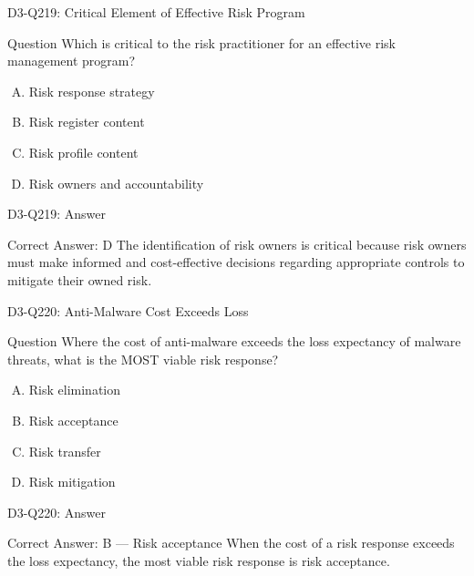 \documentclass{beamer}
\begin{document}
	\begin{frame}{D3-Q219: Critical Element of Effective Risk Program}
		\begin{block}{Question}
			Which is critical to the risk practitioner for an effective risk management program?
		\end{block}
		\begin{enumerate}[(A)]
			\item Risk response strategy
			\item Risk register content
			\item Risk profile content
			\item Risk owners and accountability
		\end{enumerate}
	\end{frame}
	\begin{frame}{D3-Q219: Answer}
		\begin{block}{Correct Answer: D}
			The identification of risk owners is critical because risk owners must make informed and cost-effective decisions regarding appropriate controls to mitigate their owned risk.
		\end{block}
	\end{frame}
	
	\begin{frame}{D3-Q220: Anti-Malware Cost Exceeds Loss}
		\begin{block}{Question}
			Where the cost of anti-malware exceeds the loss expectancy of malware threats, what is the MOST viable risk response?
		\end{block}
		\begin{enumerate}[(A)]
			\item Risk elimination
			\item Risk acceptance
			\item Risk transfer
			\item Risk mitigation
		\end{enumerate}
	\end{frame}
	\begin{frame}{D3-Q220: Answer}
		\begin{block}{Correct Answer: B --- Risk acceptance}
			When the cost of a risk response exceeds the loss expectancy, the most viable risk response is risk acceptance.
		\end{block}
	\end{frame}
	
\end{document}
